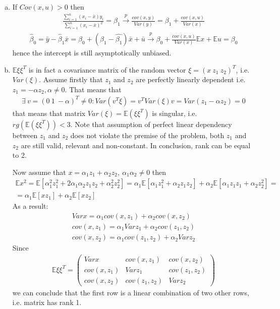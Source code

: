 \documentclass[a4paper]{article}
\newcommand{\expect}{\mathbb{E}}
\newcommand{\summa}{\sum_{i=1}^n}
\begin{document}
\begin{enumerate}[(a)]
	\item If $Cov(x, u) > 0$ then
	\begin{align*}
	\frac{\summa (x_i - \bar{x})y_i}{\summa (x_i - \bar{x})^2} = \hat{\beta}_1 \overset{p}{\to} \frac{cov(x, y)}{Var(y)} = \beta_1 + \frac{cov(x, u)}{Var(x)}
	\end{align*}
	\begin{align*}
	\hat{\beta}_0 = \bar{y} - \hat{\beta}_1 \bar{x} = \beta_0 + (\beta_1 - \hat{\beta_1})\bar{x} + \bar{u} \overset{p}{\to} \beta_0 + \frac{cov(x, u)}{Var(x)}\expect x + \expect u = \beta_0
	\end{align*}
	hence the intercept is still asymptotically unbiased.
	\item $\expect \xi \xi^T$ is in fact a covariance matrix of the random vector $\xi = (x\ z_1\ z_2)^T$, i.e. $Var(\xi)$. Assume firstly that $z_1$ and $z_2$ are perfectly linearly dependent i.e. $z_1 = -\alpha z_2, \alpha \neq 0$. That means that
	\begin{align*}
	\exists\ v = (0\ 1\ -\alpha)^T \neq 0: Var(v^T\xi) = v^T Var(\xi) v = Var(z_1 -\alpha z_2) = 0
	\end{align*}
	that means that matrix $Var(\xi) = \expect (\xi \xi^T)$ is singular, i.e. $rg(\expect(\xi\xi^T)) < 3$. Note that assumption of perfect linear dependency between $z_1$ and $z_2$ does not violate the premise of the problem, both $z_1$ and $z_2$ are still valid, relevant and non-constant. In conclusion, rank can be equal to 2.
	
	Now assume that $x = \alpha_1 z_1 + \alpha_2 z_2,\  \alpha_1\alpha_2 \neq 0$ then
	\begin{align*}
	\expect x^2 = \expect[\alpha_1^2z_1^2 + 2\alpha_1\alpha_2z_1z_2 + \alpha_2^2z_2^2] = \alpha_1\expect[\alpha_1z_1^2 + \alpha_2z_1z_2] + \alpha_2\expect[\alpha_1z_1z_1 + \alpha_2z_2^2] =\\ =\alpha_1\expect[xz_1] + \alpha_2 \expect[xz_2]
	\end{align*}
	As a result:
	\begin{align*}
	Varx = \alpha_1 cov(x, z_1) + \alpha_2 cov(x, z_2)\\
	cov(x, z_1) = \alpha_1 Varz_1 + \alpha_2 cov(z_1, z_2)\\
	cov(x, z_2) = \alpha_1 cov(z_1, z_2) + \alpha_2Varz_2
	\end{align*}
	Since
	\begin{align*}
	\expect \xi\xi^T = \begin{pmatrix}
	Varx & cov(x, z_1) & cov(x, z_2)\\
	cov(x, z_1) & Var z_1 & cov(z_1, z_2)\\
	cov(x, z_2) & cov(z_1, z_2) & Varz_2
	\end{pmatrix}
	\end{align*}
	we can conclude that the first row is a linear combination of two other rows, i.e. matrix has rank 1.
	

\end{enumerate}
\end{document}
